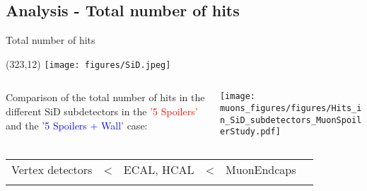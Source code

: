 \documentclass[xcolor={dvipsnames}]{beamer}
\newcommand{\sidlogo}{
  \setlength{\TPHorizModule}{1pt}
  \setlength{\TPVertModule}{1pt}
  \begin{textblock}{1}(323,12)
   \texttt{[image: figures/SiD.jpeg]}
  \end{textblock}
  }
\begin{document}
\subsection{Analysis - Total number of hits}
\begin{frame}{Total number of hits}
\sidlogo
\begin{columns}
 \begin{column}{0.23\textwidth}
 \small
  Comparison of the total number of hits in the different SiD subdetectors in the \textcolor{red}{'5 Spoilers'} and the \textcolor{blue}{'5 Spoilers + Wall'} case:
 \end{column}
 \begin{column}{0.8\textwidth}
\texttt{[image: muons\_figures/figures/Hits\_in\_SiD\_subdetectors\_MuonSpoilerStudy.pdf]}
 \end{column}
\end{columns}
\begin{center}
\begin{tabular}{@{}p{}p{}p{}p{}p{}p{}@{}}
 \centering Vertex detectors & < & \centering ECAL, HCAL & < & \centering MuonEndcaps & \\
  \centering{\scriptsize Smallest effective detector area} & &  \centering{\scriptsize Particle showers} & &  \centering{\scriptsize Biggest effective detector area}&
\end{tabular}
\end{center}
\end{frame}
\end{document}
